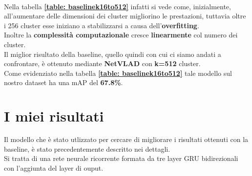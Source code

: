 \\Nella tabella \textbf{\ref{table: baselinek16to512}} infatti si vede come, inizialmente, all'aumentare delle dimensioni dei cluster migliorino le prestazioni, tuttavia oltre i 256 cluster esse iniziano a stabilizzarsi a causa dell'\textbf{overfitting}.
\\Inoltre la \textbf{complessità computazionale} cresce \textbf{linearmente} col numero dei cluster.\\
\linebreak
Il miglior risultato della baseline, quello quindi con cui ci siamo andati a confrontare, è ottenuto mediante \textbf{NetVLAD} con \textbf{k=512} cluster.
\\Come evidenziato nella tabella \textbf{\ref{table: baselinek16to512}} tale modello sul nostro dataset ha una mAP del \textbf{67.8\%}.
\section{I miei risultati}
Il modello che è stato utlizzato per cercare di migliorare i risultati ottenuti con la baseline, è stato precedentemente descritto nei dettagli.
\\Si tratta di una rete neurale ricorrente formata da tre layer GRU bidirezionali con l'aggiunta del layer di ouput.
